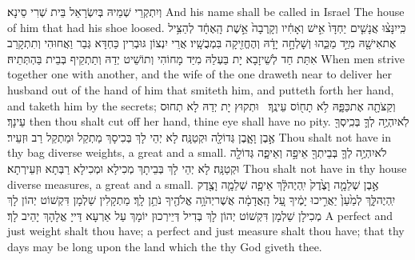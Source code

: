 {וְיִתְקְרֵי שְׁמֵיהּ בְּיִשְׂרָאֵל בֵּית שְׁרִי סֵינָא׃}
{And his name shall be called in Israel The house of him that had his shoe loosed.}{}
{כִּֽי\maqqaf יִנָּצ֨וּ אֲנָשִׁ֤ים יַחְדָּו֙ אִ֣ישׁ וְאָחִ֔יו וְקָֽרְבָה֙ אֵ֣שֶׁת הָֽאֶחָ֔ד לְהַצִּ֥יל אֶת\maqqaf אִישָׁ֖הּ מִיַּ֣ד מַכֵּ֑הוּ וְשָׁלְחָ֣ה יָדָ֔הּ וְהֶחֱזִ֖יקָה בִּמְבֻשָֽׁיו׃}
{אֲרֵי יִנְצוֹן גּוּבְרִין כַּחְדָּא גְּבַר וַאֲחוּהִי וְתִתְקָרַב אִתַּת חַד לְשֵׁיזָבָא יָת בַּעְלַהּ מִיַּד מָחוֹהִי וְתוֹשֵׁיט יְדַהּ וְתַתְקֵיף בְּבֵית בַּהְתְּתֵיהּ׃}
{When men strive together one with another, and the wife of the one draweth near to deliver her husband out of the hand of him that smiteth him, and putteth forth her hand, and taketh him by the secrets;}{}
{וְקַצֹּתָ֖ה אֶת\maqqaf כַּפָּ֑הּ לֹ֥א תָח֖וֹס עֵינֶֽךָ׃ \setuma }
{וּתְקוּץ יָת יְדַהּ לָא תְחוּס עֵינָךְ׃}
{then thou shalt cut off her hand, thine eye shall have no pity.}{}
{לֹֽא\maqqaf יִהְיֶ֥ה לְךָ֛ בְּכִֽיסְךָ֖ אֶ֣בֶן וָאָ֑בֶן גְּדוֹלָ֖ה וּקְטַנָּֽה׃}
{לָא יְהֵי לָךְ בְּכִיסָךְ מַתְקַל וּמַתְקַל רַב וּזְעֵיר׃}
{Thou shalt not have in thy bag diverse weights, a great and a small.}{}
{לֹא\maqqaf יִהְיֶ֥ה לְךָ֛ בְּבֵיתְךָ֖ אֵיפָ֣ה וְאֵיפָ֑ה גְּדוֹלָ֖ה וּקְטַנָּֽה׃}
{לָא יְהֵי לָךְ בְּבֵיתָךְ מְכִילָא וּמְכִילָא רַבְּתָא וּזְעֵירְתָא׃}
{Thou shalt not have in thy house diverse measures, a great and a small.}{}
{אֶ֣בֶן שְׁלֵמָ֤ה וָצֶ֙דֶק֙ יִֽהְיֶה\maqqaf לָּ֔ךְ אֵיפָ֧ה שְׁלֵמָ֛ה וָצֶ֖דֶק יִֽהְיֶה\maqqaf לָּ֑ךְ לְמַ֙עַן֙ יַאֲרִ֣יכוּ יָמֶ֔יךָ עַ֚ל הָֽאֲדָמָ֔ה אֲשֶׁר\maqqaf יְהֹוָ֥ה אֱלֹהֶ֖יךָ נֹתֵ֥ן לָֽךְ׃}
{מַתְקָלִין שַׁלְמָן דִּקְשׁוֹט יְהוֹן לָךְ מְכִילָן שַׁלְמָן דִּקְשׁוֹט יְהוֹן לָךְ בְּדִיל דְּיֵירְכוּן יוֹמָךְ עַל אַרְעָא דַּייָ אֱלָהָךְ יָהֵיב לָךְ׃}
{A perfect and just weight shalt thou have; a perfect and just measure shalt thou have; that thy days may be long upon the land which the \lord\space thy God giveth thee.}{}
